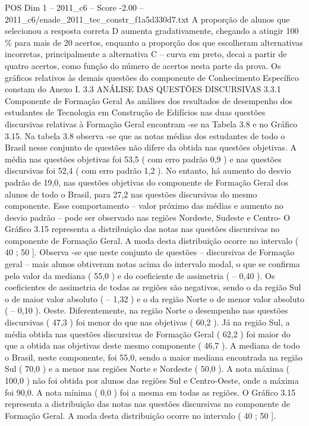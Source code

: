 \begin{textsample}{POS Dim 1 – 2011\_c6 – Score -2.00 – 2011\_c6/enade\_2011\_tec\_constr\_f1a5d330d7.txt}
A proporção de alunos que selecionou a resposta correta D aumenta gradativamente, chegando a atingir 100 \% para mais de 20 acertos, enquanto a proporção dos que escolheram alternativas incorretas, principalmente a alternativa C – curva em preto, decai a partir de quatro acertos, como função do número de acertos nesta parte da prova.
Os gráficos relativos às demais questões do componente de Conhecimento Específico constam do Anexo I. 3.3 ANÁLISE DAS QUESTÕES DISCURSIVAS 3.3.1 Componente de Formação Geral As análises dos resultados de desempenho dos estudantes de Tecnologia em Construção de Edifícios nas duas questões discursivas relativas à Formação Geral encontram -se na Tabela 3.8 e no Gráfico 3.15.
Na tabela 3.8 observa -se que as notas médias dos estudantes de todo o Brasil nesse conjunto de questões não difere da obtida nas questões objetivas.
A média nas questões objetivas foi 53,5 ( com erro padrão 0,9 ) e nas questões discursivas foi 52,4 ( com erro padrão 1,2 ).
No entanto, há aumento do desvio padrão de 19,0, nas questões objetivas do componente de Formação Geral dos alunos de todo o Brasil, para 27,2 nas questões discursivas do mesmo componente.
Esse comportamento – valor próximo das médias e aumento no desvio padrão – pode ser observado nas regiões Nordeste, Sudeste e Centro- O Gráfico 3.15 representa a distribuição das notas nas questões discursivas no componente de Formação Geral.
A moda desta distribuição ocorre no intervalo ( 40 ; 50 ].
Observa -se que neste conjunto de questões – discursivas de Formação geral – mais alunos obtiveram notas acima do intervalo modal, o que se confirma pelo valor da mediana ( 55,0 ) e do coeficiente de assimetria ( – 0,40 ).
Os coeficientes de assimetria de todas as regiões são negativos, sendo o da região Sul o de maior valor absoluto ( – 1,32 ) e o da região Norte o de menor valor absoluto ( – 0,10 ).
Oeste.
Diferentemente, na região Norte o desempenho nas questões discursivas ( 47,3 ) foi menor do que nas objetivas ( 60,2 ).
Já na região Sul, a média obtida nas questões discursivas de Formação Geral ( 62,2 ) foi maior do que a obtida nas objetivas deste mesmo componente ( 46,7 ).
A mediana de todo o Brasil, neste componente, foi 55,0, sendo a maior mediana encontrada na região Sul ( 70,0 ) e a menor nas regiões Norte e Nordeste ( 50,0 ).
A nota máxima ( 100,0 ) não foi obtida por alunos das regiões Sul e Centro-Oeste, onde a máxima foi 90,0.
A nota mínima ( 0,0 ) foi a mesma em todas as regiões.
O Gráfico 3.15 representa a distribuição das notas nas questões discursivas no componente de Formação Geral.
A moda desta distribuição ocorre no intervalo ( 40 ; 50 ].

\end{textsample}
